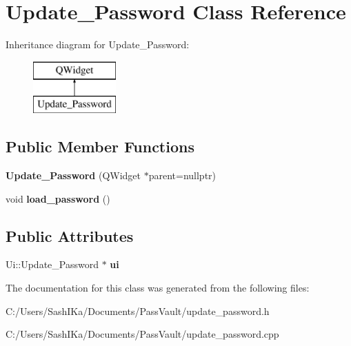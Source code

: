 \hypertarget{class_update___password}{}\section{Update\+\_\+\+Password Class Reference}
\label{class_update___password}
Inheritance diagram for Update\+\_\+\+Password\+:\begin{figure}[H]
\begin{center}
\leavevmode
\includegraphics[height=2.000000cm]{class_update___password}
\end{center}
\end{figure}
\subsection*{Public Member Functions}
\begin{DoxyCompactItemize}
\item 
\mbox{\label{class_update___password_aac4b56c85a503c5a740ccb00edc9c574}} 
{\bfseries Update\+\_\+\+Password} (Q\+Widget $\ast$parent=nullptr)
\item 
\mbox{\label{class_update___password_abca8c04bb1157e8ca7fee121cee41505}} 
void {\bfseries load\+\_\+password} ()
\end{DoxyCompactItemize}
\subsection*{Public Attributes}
\begin{DoxyCompactItemize}
\item 
\mbox{\label{class_update___password_a88e3ede1d48873eea35ee4155a062330}} 
Ui\+::\+Update\+\_\+\+Password $\ast$ {\bfseries ui}
\end{DoxyCompactItemize}


The documentation for this class was generated from the following files\+:\begin{DoxyCompactItemize}
\item 
C\+:/\+Users/\+Sash\+I\+Ka/\+Documents/\+Pass\+Vault/update\+\_\+password.\+h\item 
C\+:/\+Users/\+Sash\+I\+Ka/\+Documents/\+Pass\+Vault/update\+\_\+password.\+cpp\end{DoxyCompactItemize}
